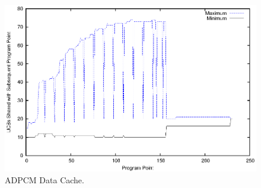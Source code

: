 \begin{figure}[h!]
\vspace{-10pt}
\begin{center}
\includegraphics[width=\linewidth]{eps/adpcm-dcache.eps}
\caption{ADPCM Data Cache.}
\label{fig:adpcm_data_cache}
\end{center}
\vspace{-10pt}
\end{figure}
%





